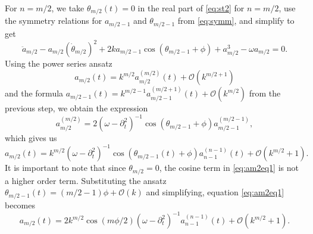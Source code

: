 \documentclass[11pt,reqno]{amsart}
\begin{document}
For $n=m/2$, we take $\theta_{m/2}(t) = 0$ in the real part of \cref{eq:st2} for $n = m/2$, use the symmetry relations for $a_{m/2-1}$ and $\theta_{m/2-1}$ from \cref{eq:symm}, and simplify to get
\[
\ddot a_{m/2} - a_{m/2} (\dot \theta_{m/2})^2 + 
2 k a_{m/2-1}\cos( \theta_{m/2-1} + \phi) + a_{m/2}^3 - \omega a_{m/2} = 0.
\]
Using the power series ansatz
\[
a_{m/2}(t) = k^{m/2} a_{m/2}^{({m/2})}(t) + \mathcal{O}(k^{m/2+1})
\]
and the formula $a_{m/2-1}(t) = k^{m/2-1}a_{m/2-1}^{(m/2+1)}(t) + \mathcal{O}(k^{m/2})$ from the previous step, we obtain the expression
\begin{equation}\label{eq:am2}
a_{m/2}^{({m/2})} = 2 (\omega - \partial_t^2)^{-1}\cos( \theta_{m/2-1} + \phi) a_{m/2-1}^{(m/2-1)},
\end{equation}
which gives us
\begin{equation}\label{eq:am2eq1}
a_{m/2}(t) = k^{m/2} (\omega - \partial_t^2)^{-1} \cos( \theta_{m/2-1}(t) + \phi)a_{n-1}^{(n-1)}(t) + \mathcal{O}(k^{m/2}+1).
\end{equation}
It is important to note that since $\theta_{m/2} = 0$, the cosine term in \cref{eq:am2eq1} is not a higher order term. Substituting the ansatz $\theta_{m/2-1}(t) = (m/2-1)\phi + \mathcal{O}(k)$ and simplifying, equation \cref{eq:am2eq1} becomes
\begin{equation}\label{eq:am2eq}
a_{m/2}(t) = 2 k^{m/2} \cos\left( m \phi / 2\right) (\omega - \partial_t^2)^{-1} a_{n-1}^{(n-1)}(t) + \mathcal{O}(k^{m/2}+1).
\end{equation}
\end{document}
